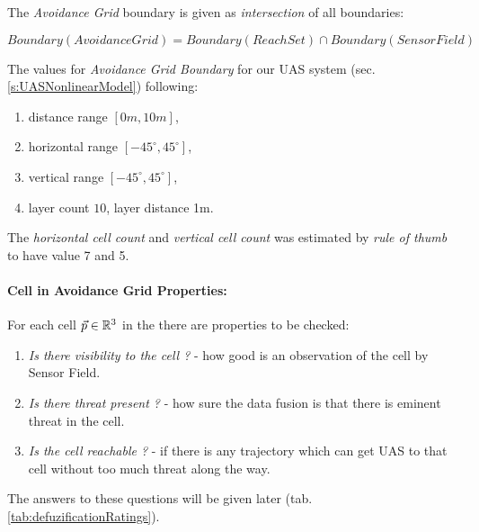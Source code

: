 \noindent The \emph{Avoidance Grid} boundary is given as \emph{intersection} of all boundaries:

\begin{equation}
    Boundary(Avoidance Grid) =  Boundary(Reach Set) \cap Boundary(Sensor Field)
\end{equation}

\newpage
\noindent The values for \emph{Avoidance Grid Boundary} for our UAS system (sec. \ref{s:UASNonlinearModel}) following:
\begin{enumerate}
    \item distance range $[0m,10m]$,
    \item horizontal range $[-45^\circ,45^\circ]$,
    \item vertical range $[-45^\circ,45^\circ]$,
    \item layer count $10$, layer distance 1m.
\end{enumerate}

The \emph{horizontal cell count} and \emph{vertical cell count} was estimated by \emph{rule of thumb} to have value 7 and 5.

\paragraph{Cell in Avoidance Grid Properties:}\noindent For each cell $\vec{p}\in\mathbb{R}^3$ in the there are properties to be checked:

\begin{enumerate}
    \item \emph{Is there visibility to the cell ?} - how good is an observation of the cell by Sensor Field.
    
    \item \emph{Is there threat present ?} - how sure the data fusion is that there is eminent threat in the cell.
    
    \item \emph{Is the cell reachable ?} - if there is any trajectory which can get UAS to that cell without too much threat along the way.
\end{enumerate}

\noindent The answers to these questions will be given later (tab. \ref{tab:defuzificationRatings}).
